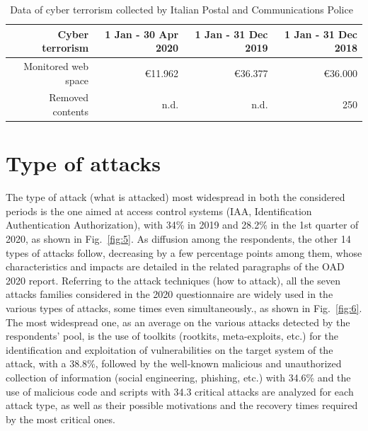 \documentclass{easychair}
\begin{document}
\begin{table}[h]
  \begin{center}
	\begin{tabular}{|r|r|r|r|}									
		\hline									
		Cyber terrorism	&	1 Jan - 30 Apr 2020	&	1 Jan - 31 Dec 2019	&	1 Jan - 31 Dec 2018\\
		\hline									
		Monitored web space	&	\euro 11.962	&	\euro 36.377	&	\euro 36.000\\
		Removed contents 	&	n.d.	&	n.d.	&	250\\
		\hline	
	\end{tabular}
        \end{center}
	\caption{Data of cyber terrorism collected by Italian Postal and Communications Police~\cite{oad20}}									
	\label{tab:table3}									
\end{table}	

\section{Type of attacks}\label{sec:TypeAttacks}

The type of attack (what is attacked) most widespread in both the considered periods is the one aimed at access control systems (IAA, Identification Authentication Authorization), 
with 34\% in 2019 and 28.2\% in the 1st quarter of 2020, as shown in Fig.~\ref{fig:5}. As diffusion among the respondents, the other 14 types of attacks follow, decreasing by a few percentage
points among them, whose characteristics and impacts are detailed in the related paragraphs of the OAD 2020 report. Referring to the attack techniques (how to attack), all the seven
attacks families considered in the 2020 questionnaire are widely used in the various types of attacks, some times even simultaneously., as shown in Fig.~\ref{fig:6}. The most widespread one,
as an average on the various attacks detected by the respondents’ pool, is the use of toolkits (rootkits, meta-exploits, etc.) for the identification and exploitation of vulnerabilities
on the target system of the attack, with a 38.8\%, followed by the well-known malicious and unauthorized collection of information (social engineering, phishing, etc.) with 34.6\% 
and the use of malicious code and scripts with 34.3%
critical attacks are analyzed for each attack type, as well as their possible motivations and the recovery times required by the most critical ones.
\end{document}
